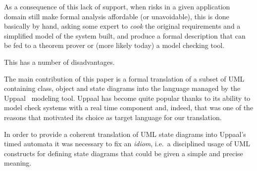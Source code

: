 

As a consequence of this lack of support, when risks in a given
application domain still make formal analysis affordable (or
unavoidable), this is done basically by hand, asking some expert to
\emph{cook} the original requirements and a simplified model of the
system built, and produce a formal description that can be fed to a
theorem prover or (more likely today) a model checking tool.


This has a number of disadvantages. 

The main contribution of this paper is a formal translation of a subset
of UML containing class, object and state diagrams into the language
managed by the Uppaal~\cite{so51010} modeling tool. Uppaal has become
quite popular thanks to its ability to model check systems with a real
time component and, indeed, that was one of the reasons that motivated its
choice as target language for our translation.

In order to provide a coherent translation of UML state diagrams into
Uppaal's timed automata it was necessary to fix an \emph{idiom},
i.e.~a disciplined usage of UML constructs for defining state diagrams
that could be given a simple and precise meaning. 

